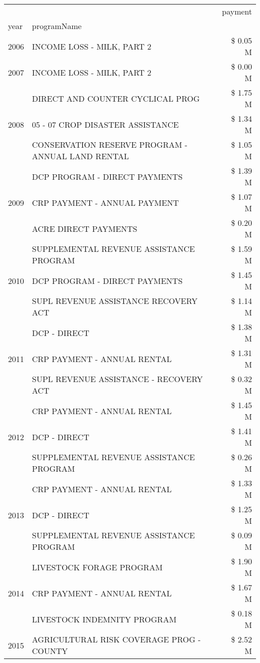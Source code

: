 \begin{tabular}{llr}
\toprule
 &  & payment \\
year & programName &  \\
\midrule
2006 & INCOME LOSS - MILK, PART 2 & \$ 0.05 M \\
\cline{1-3}
2007 & INCOME LOSS - MILK, PART 2 & \$ 0.00 M \\
\cline{1-3}
\multirow[t]{3}{*}{2008} & DIRECT AND COUNTER CYCLICAL PROG & \$ 1.75 M \\
 & 05 - 07 CROP DISASTER ASSISTANCE & \$ 1.34 M \\
 & CONSERVATION RESERVE PROGRAM - ANNUAL LAND RENTAL & \$ 1.05 M \\
\cline{1-3}
\multirow[t]{3}{*}{2009} & DCP PROGRAM - DIRECT PAYMENTS & \$ 1.39 M \\
 & CRP PAYMENT - ANNUAL PAYMENT & \$ 1.07 M \\
 & ACRE DIRECT PAYMENTS & \$ 0.20 M \\
\cline{1-3}
\multirow[t]{3}{*}{2010} & SUPPLEMENTAL REVENUE ASSISTANCE PROGRAM & \$ 1.59 M \\
 & DCP PROGRAM - DIRECT PAYMENTS & \$ 1.45 M \\
 & SUPL REVENUE ASSISTANCE RECOVERY ACT & \$ 1.14 M \\
\cline{1-3}
\multirow[t]{3}{*}{2011} & DCP - DIRECT & \$ 1.38 M \\
 & CRP PAYMENT - ANNUAL RENTAL & \$ 1.31 M \\
 & SUPL REVENUE ASSISTANCE - RECOVERY ACT & \$ 0.32 M \\
\cline{1-3}
\multirow[t]{3}{*}{2012} & CRP PAYMENT - ANNUAL RENTAL & \$ 1.45 M \\
 & DCP - DIRECT & \$ 1.41 M \\
 & SUPPLEMENTAL REVENUE ASSISTANCE PROGRAM & \$ 0.26 M \\
\cline{1-3}
\multirow[t]{3}{*}{2013} & CRP PAYMENT - ANNUAL RENTAL & \$ 1.33 M \\
 & DCP - DIRECT & \$ 1.25 M \\
 & SUPPLEMENTAL REVENUE ASSISTANCE PROGRAM & \$ 0.09 M \\
\cline{1-3}
\multirow[t]{3}{*}{2014} & LIVESTOCK FORAGE PROGRAM & \$ 1.90 M \\
 & CRP PAYMENT - ANNUAL RENTAL & \$ 1.67 M \\
 & LIVESTOCK INDEMNITY PROGRAM & \$ 0.18 M \\
\cline{1-3}
\multirow[t]{3}{*}{2015} & AGRICULTURAL RISK COVERAGE PROG - COUNTY & \$ 2.52 M \\

\end{tabular}
